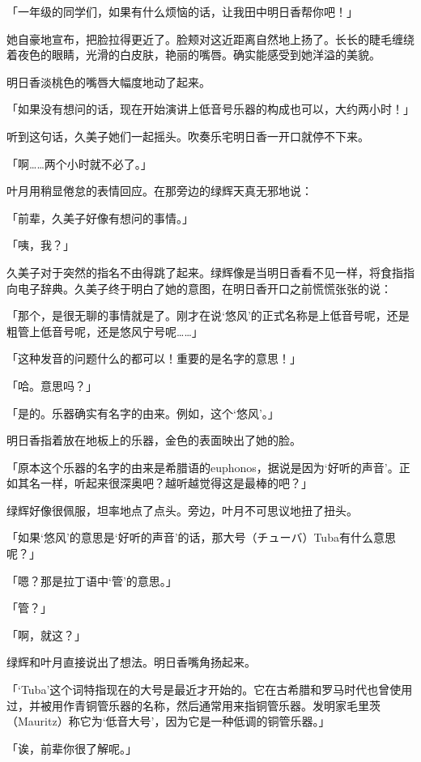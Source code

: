 \documentclass[UTF8]{ctexart}
\begin{document}
    「一年级的同学们，如果有什么烦恼的话，让我田中明日香帮你吧！」

    她自豪地宣布，把脸拉得更近了。脸颊对这近距离自然地上扬了。长长的睫毛缠绕着夜色的眼睛，光滑的白皮肤，艳丽的嘴唇。确实能感受到她洋溢的美貌。

    明日香淡桃色的嘴唇大幅度地动了起来。

    「如果没有想问的话，现在开始演讲上低音号乐器的构成也可以，大约两小时！」

    听到这句话，久美子她们一起摇头。吹奏乐宅明日香一开口就停不下来。

    「啊……两个小时就不必了。」

    叶月用稍显倦怠的表情回应。在那旁边的绿辉天真无邪地说：

    「前辈，久美子好像有想问的事情。」

    「咦，我？」

    久美子对于突然的指名不由得跳了起来。绿辉像是当明日香看不见一样，将食指指向电子辞典。久美子终于明白了她的意图，在明日香开口之前慌慌张张的说：

    「那个，是很无聊的事情就是了。刚才在说‘悠风’的正式名称是上低音号呢，还是粗管上低音号呢，还是悠风宁号呢……」

    「这种发音的问题什么的都可以！重要的是名字的意思！」

    「哈。意思吗？」

    「是的。乐器确实有名字的由来。例如，这个‘悠风’。」

    明日香指着放在地板上的乐器，金色的表面映出了她的脸。

    「原本这个乐器的名字的由来是希腊语的euphonos，据说是因为‘好听的声音’。正如其名一样，听起来很深奥吧？越听越觉得这是最棒的吧？」

    绿辉好像很佩服，坦率地点了点头。旁边，叶月不可思议地扭了扭头。

    「如果‘悠风’的意思是‘好听的声音’的话，那大号（チューバ）Tuba有什么意思呢？」

    「嗯？那是拉丁语中‘管’的意思。」

    「管？」

    「啊，就这？」

    绿辉和叶月直接说出了想法。明日香嘴角扬起来。

    「‘Tuba’这个词特指现在的大号是最近才开始的。它在古希腊和罗马时代也曾使用过，并被用作青铜管乐器的名称，然后通常用来指铜管乐器。发明家毛里茨（Mauritz）称它为‘低音大号’，因为它是一种低调的铜管乐器。」

    「诶，前辈你很了解呢。」
\end{document}
